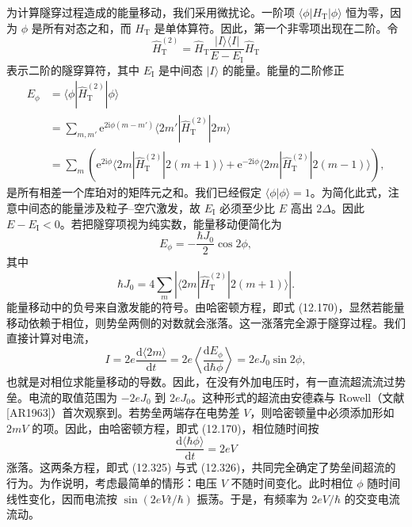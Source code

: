 为计算隧穿过程造成的能量移动，我们采用微扰论。一阶项 $\langle\phi|H_{\mathrm{T}}|\phi\rangle$ 恒为零，因为 $\phi$ 是所有对态之和，而 $H_{\mathrm{T}}$ 是单体算符。因此，第一个非零项出现在二阶。令
\begin{equation*}
\widehat{H}_{\mathrm{T}}^{(2)}=\widehat{H}_{\mathrm{T}}\frac{|I\rangle\langle I|}{E-E_{\mathrm{I}}}\widehat{H}_{\mathrm{T}}\tag{12.321}
\end{equation*}
表示二阶的隧穿算符，其中 $E_{\mathrm{I}}$ 是中间态 $|I\rangle$ 的能量。能量的二阶修正
\begin{align*}
E_{\phi}&=\langle\phi|\widehat{H}_{\mathrm{T}}^{(2)}|\phi\rangle\\
&=\sum_{m,m'}\mathrm{e}^{2\mathrm{i}\phi(m-m')}\langle 2m'|\widehat{H}_{\mathrm{T}}^{(2)}|2m\rangle\\
&=\sum_{m}\left(\mathrm{e}^{2\mathrm{i}\phi}\langle 2m|\widehat{H}_{\mathrm{T}}^{(2)}|2(m+1)\rangle+\mathrm{e}^{-2\mathrm{i}\phi}\langle 2m|\widehat{H}_{\mathrm{T}}^{(2)}|2(m-1)\rangle\right),\tag{12.322}
\end{align*}
是所有相差一个库珀对的矩阵元之和。我们已经假定 $\langle\phi|\phi\rangle=1$。为简化此式，注意中间态的能量涉及粒子–空穴激发，故 $E_{\mathrm{I}}$ 必须至少比 $E$ 高出 $2\Delta$。因此 $E-E_{\mathrm{I}}<0$。若把隧穿项视为纯实数，能量移动便简化为
\begin{equation*}
E_{\phi}=-\frac{\hbar J_{0}}{2}\cos 2\phi,\tag{12.323}
\end{equation*}
其中
\begin{equation*}
\hbar J_{0}=4\sum_{m}\left|\langle 2m|\widehat{H}_{\mathrm{T}}^{(2)}|2(m+1)\rangle\right|.\tag{12.324}
\end{equation*}
能量移动中的负号来自激发能的符号。由哈密顿方程，即式 (12.170)，显然若能量移动依赖于相位，则势垒两侧的对数就会涨落。这一涨落完全源于隧穿过程。我们直接计算对电流，
\begin{equation*}
I=2e\frac{\mathrm{d}\langle 2m\rangle}{\mathrm{d}t}=2e\left\langle\frac{\mathrm{d}E_{\phi}}{\mathrm{d}\hbar\phi}\right\rangle=2eJ_{0}\sin 2\phi,\tag{12.325}
\end{equation*}
也就是对相位求能量移动的导数。因此，在没有外加电压时，有一直流超流流过势垒。电流的取值范围为 $-2eJ_{0}$ 到 $2eJ_{0}$。这种形式的超流由安德森与 Rowell（文献 [AR1963]）首次观察到。若势垒两端存在电势差 $V$，则哈密顿量中必须添加形如 $2mV$ 的项。因此，由哈密顿方程，即式 (12.170)，相位随时间按
\begin{equation*}
\frac{\mathrm{d}\langle\hbar\phi\rangle}{\mathrm{d}t}=2eV\tag{12.326}
\end{equation*}
涨落。这两条方程，即式 (12.325) 与式 (12.326)，共同完全确定了势垒间超流的行为。为作说明，考虑最简单的情形：电压 $V$ 不随时间变化。此时相位 $\phi$ 随时间线性变化，因而电流按 $\sin\left(2eVt/\hbar\right)$ 振荡。于是，有频率为 $2eV/\hbar$ 的交变电流流动。

